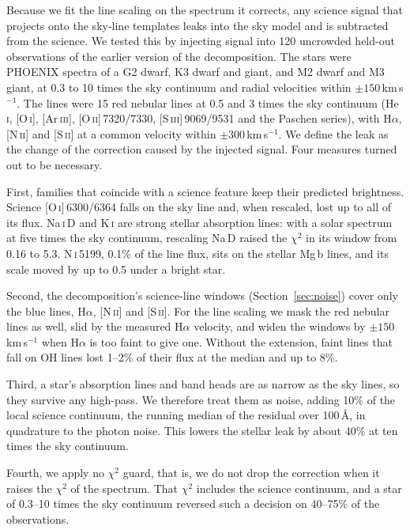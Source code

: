 Because we fit the line scaling on the spectrum it corrects, any science
signal that projects onto the sky-line templates leaks into the sky model and
is subtracted from the science. We tested this by injecting signal into 120
uncrowded held-out observations of the earlier version of the
decomposition. The stars were PHOENIX spectra \citep{Husser2013} of a G2
dwarf, K3 dwarf and giant, and M2 dwarf and M3 giant, at 0.3 to 10 times the
sky continuum and radial velocities within $\pm150$\,km\,s$^{-1}$. The lines
were 15 red nebular lines at 0.5 and 3 times the sky continuum (He\,\textsc{i},
[O\,\textsc{i}], [Ar\,\textsc{iii}], [O\,\textsc{ii}]\,7320/7330,
[S\,\textsc{iii}]\,9069/9531 and the Paschen series), with H$\alpha$,
[N\,\textsc{ii}] and [S\,\textsc{ii}] at a common velocity within
$\pm300$\,km\,s$^{-1}$. We define the leak as the change of the correction
caused by the injected signal. Four measures turned out to be necessary.

First, families that coincide with a science feature keep their predicted
brightness. Science [O\,\textsc{i}]\,6300/6364 falls on the sky line and,
when rescaled, lost up to all of its flux. Na\,\textsc{i}\,D and
K\,\textsc{i} are strong stellar absorption lines: with a solar spectrum at
five times the sky continuum, rescaling Na\,D raised the $\chi^2$ in its
window from 0.16 to 5.3. N\,\textsc{i}\,5199, 0.1\% of the line flux, sits on
the stellar Mg\,b lines, and its scale moved by up to 0.5 under a bright
star.

Second, the decomposition's science-line windows (Section~\ref{sec:noise})
cover only the blue lines, H$\alpha$, [N\,\textsc{ii}] and
[S\,\textsc{ii}]. For the line scaling we mask the red nebular lines as
well, slid by the measured H$\alpha$ velocity, and widen the windows by
$\pm150$\,km\,s$^{-1}$ when H$\alpha$ is too faint to give one. Without the
extension, faint lines that fall on OH lines lost 1--2\% of their flux at
the median and up to 8\%.

Third, a star's absorption lines and band heads are as narrow as the sky
lines, so they survive any high-pass. We therefore treat them as noise,
adding 10\% of the local science continuum, the running median of the
residual over 100\,\AA, in quadrature to the photon noise. This lowers the
stellar leak by about 40\% at ten times the sky continuum.

Fourth, we apply no $\chi^2$ guard, that is, we do not drop the correction
when it raises the $\chi^2$ of the spectrum. That $\chi^2$ includes the
science continuum, and a star of 0.3--10 times the sky continuum reversed
such a decision on 40--75\% of the observations.

